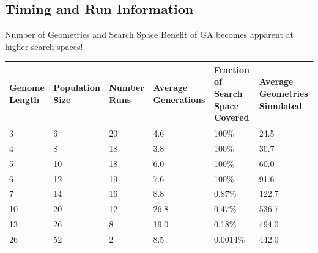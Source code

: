 \documentclass[compress]{beamer}
\begin{document}
\subsection{Timing and Run Information}
\begin{frame}{Number of Geometries and Search Space}
Benefit of GA becomes apparent at higher search spaces!
\begin{table}
    \centering
    \tiny
    \begin{tabular}{ p{0.75cm} | p{1cm} p{1cm} p{1cm} p{1cm} p{1cm}}
      Genome Length&Population Size&Number Runs&Average Generations&Fraction of Search Space Covered&Average Geometries Simulated \\
      \hline
      \hline
      3&6&20&4.6&100\%&24.5 \\
			4&8&18&3.8&100\%&30.7 \\
			5&10&18&6.0&100\%& 60.0 \\
			6&12&19&7.6&100\%&91.6 \\
			7&14&16&8.8&0.87\%&122.7 \\
			10&20&12&26.8&0.47\%& 536.7 \\
			13&26&8&19.0&0.18\% &494.0\\
			26&52&2&8.5&0.0014\% &442.0\\
    \end{tabular}
\end{table}
\end{frame}
\end{document}
